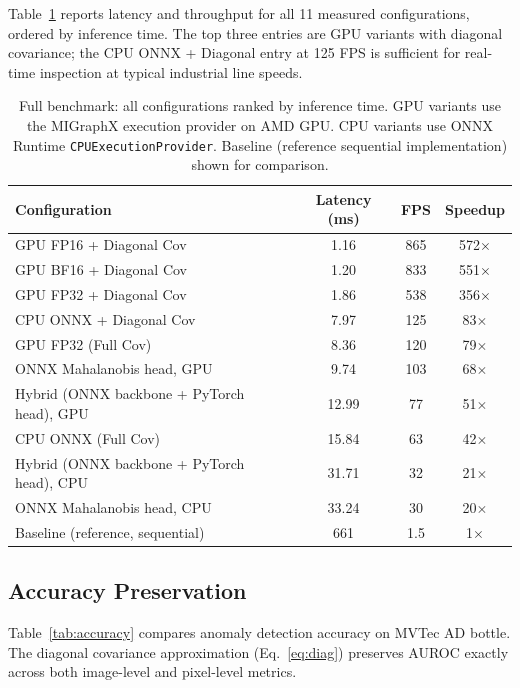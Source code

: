 \documentclass[blind]{gtac}
\begin{document}
Table~\ref{tab:benchmark} reports latency and throughput for all 11 measured
configurations, ordered by inference time.  The top three entries are GPU
variants with diagonal covariance; the CPU ONNX + Diagonal entry at 125 FPS
is sufficient for real-time inspection at typical industrial line speeds.

\begin{table}[H]
\centering
\caption{Full benchmark: all configurations ranked by inference time.
GPU variants use the MIGraphX execution provider on AMD GPU.
CPU variants use ONNX Runtime \texttt{CPUExecutionProvider}.
Baseline (reference sequential implementation) shown for comparison.}
\label{tab:benchmark}
\footnotesize
\begin{tabular}{@{}p{1.9in}ccc@{}}
\toprule
Configuration & Latency (ms) & FPS & Speedup \\
\midrule
GPU FP16 + Diagonal Cov        &  1.16  & 865 & 572$\times$ \\
GPU BF16 + Diagonal Cov        &  1.20  & 833 & 551$\times$ \\
GPU FP32 + Diagonal Cov        &  1.86  & 538 & 356$\times$ \\
CPU ONNX + Diagonal Cov        &  7.97  & 125 &  83$\times$ \\
GPU FP32 (Full Cov)            &  8.36  & 120 &  79$\times$ \\
ONNX Mahalanobis head, GPU     &  9.74  & 103 &  68$\times$ \\
Hybrid (ONNX backbone + PyTorch head), GPU & 12.99 & 77 & 51$\times$ \\
CPU ONNX (Full Cov)            & 15.84  &  63 &  42$\times$ \\
Hybrid (ONNX backbone + PyTorch head), CPU & 31.71 & 32 & 21$\times$ \\
ONNX Mahalanobis head, CPU     & 33.24  &  30 &  20$\times$ \\
\midrule
Baseline (reference, sequential)  & 661    & 1.5 & 1$\times$   \\
\bottomrule
\end{tabular}
\end{table}

\subsection{Accuracy Preservation}

Table~\ref{tab:accuracy} compares anomaly detection accuracy on MVTec AD bottle.
The diagonal covariance approximation (Eq.~\ref{eq:diag}) preserves AUROC
exactly across both image-level and pixel-level metrics.
\end{document}
